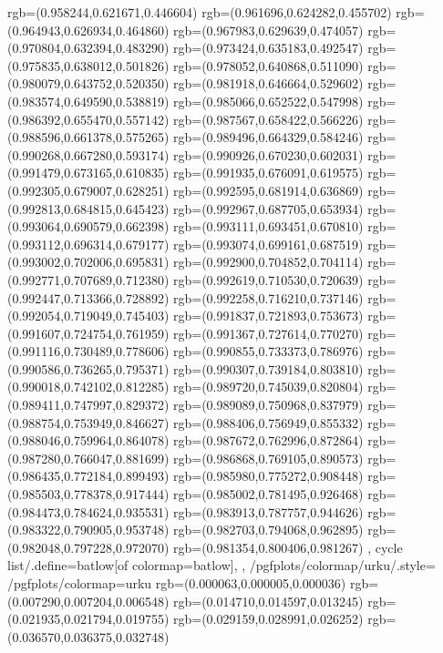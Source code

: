 {{{			rgb=(0.958244,0.621671,0.446604)
			rgb=(0.961696,0.624282,0.455702)
			rgb=(0.964943,0.626934,0.464860)
			rgb=(0.967983,0.629639,0.474057)
			rgb=(0.970804,0.632394,0.483290)
			rgb=(0.973424,0.635183,0.492547)
			rgb=(0.975835,0.638012,0.501826)
			rgb=(0.978052,0.640868,0.511090)
			rgb=(0.980079,0.643752,0.520350)
			rgb=(0.981918,0.646664,0.529602)
			rgb=(0.983574,0.649590,0.538819)
			rgb=(0.985066,0.652522,0.547998)
			rgb=(0.986392,0.655470,0.557142)
			rgb=(0.987567,0.658422,0.566226)
			rgb=(0.988596,0.661378,0.575265)
			rgb=(0.989496,0.664329,0.584246)
			rgb=(0.990268,0.667280,0.593174)
			rgb=(0.990926,0.670230,0.602031)
			rgb=(0.991479,0.673165,0.610835)
			rgb=(0.991935,0.676091,0.619575)
			rgb=(0.992305,0.679007,0.628251)
			rgb=(0.992595,0.681914,0.636869)
			rgb=(0.992813,0.684815,0.645423)
			rgb=(0.992967,0.687705,0.653934)
			rgb=(0.993064,0.690579,0.662398)
			rgb=(0.993111,0.693451,0.670810)
			rgb=(0.993112,0.696314,0.679177)
			rgb=(0.993074,0.699161,0.687519)
			rgb=(0.993002,0.702006,0.695831)
			rgb=(0.992900,0.704852,0.704114)
			rgb=(0.992771,0.707689,0.712380)
			rgb=(0.992619,0.710530,0.720639)
			rgb=(0.992447,0.713366,0.728892)
			rgb=(0.992258,0.716210,0.737146)
			rgb=(0.992054,0.719049,0.745403)
			rgb=(0.991837,0.721893,0.753673)
			rgb=(0.991607,0.724754,0.761959)
			rgb=(0.991367,0.727614,0.770270)
			rgb=(0.991116,0.730489,0.778606)
			rgb=(0.990855,0.733373,0.786976)
			rgb=(0.990586,0.736265,0.795371)
			rgb=(0.990307,0.739184,0.803810)
			rgb=(0.990018,0.742102,0.812285)
			rgb=(0.989720,0.745039,0.820804)
			rgb=(0.989411,0.747997,0.829372)
			rgb=(0.989089,0.750968,0.837979)
			rgb=(0.988754,0.753949,0.846627)
			rgb=(0.988406,0.756949,0.855332)
			rgb=(0.988046,0.759964,0.864078)
			rgb=(0.987672,0.762996,0.872864)
			rgb=(0.987280,0.766047,0.881699)
			rgb=(0.986868,0.769105,0.890573)
			rgb=(0.986435,0.772184,0.899493)
			rgb=(0.985980,0.775272,0.908448)
			rgb=(0.985503,0.778378,0.917444)
			rgb=(0.985002,0.781495,0.926468)
			rgb=(0.984473,0.784624,0.935531)
			rgb=(0.983913,0.787757,0.944626)
			rgb=(0.983322,0.790905,0.953748)
			rgb=(0.982703,0.794068,0.962895)
			rgb=(0.982048,0.797228,0.972070)
			rgb=(0.981354,0.800406,0.981267)
		},
	cycle list/.define={batlow}{[of colormap=batlow]},
	},
	/pgfplots/colormap/urku/.style={
		/pgfplots/colormap={urku}{%
			rgb=(0.000063,0.000005,0.000036)
			rgb=(0.007290,0.007204,0.006548)
			rgb=(0.014710,0.014597,0.013245)
			rgb=(0.021935,0.021794,0.019755)
			rgb=(0.029159,0.028991,0.026252)
			rgb=(0.036570,0.036375,0.032748)
}}}

